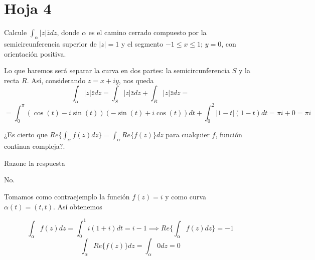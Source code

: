 \newpage
\section{Hoja 4}

\begin{problem}[1]
Calcule $\int_α |z|\bar{z}dz$, donde $α$ es el camino cerrado compuesto por la semicircunferencia superior de $|z|=1$ y el segmento $-1\leq x \leq 1$; $y=0$, con orientación positiva.

\solution


Lo que haremos será separar la curva en dos partes: la semicircunferencia $S$ y la recta $R$. Así, considerando $z=x+iy$, nos queda
\[\int_α |z|\bar{z}dz = \int_S |z|\bar{z}dz + \int_R |z|\bar{z}dz = \]
\[= \int_0^π \left(\cos(t)-i\sin(t)\right)\left(-\sin(t)+i\cos(t)\right)dt + \int_0^2 |1-t|(1-t)dt=πi+0= πi\]

\end{problem}

\begin{problem}[2]
¿Es cierto que $Re\{\int_α f(z) dz\} = \int_α Re\{f(z)\}dz$ para cualquier $f$, función continua compleja?.

Razone la respuesta
\solution


No.

Tomamos como contraejemplo la función $f(z)=i$ y como curva $α(t)=(t,t)$. Así obtenemos

\[\int_α f(z)dz = \int_0^1 i(1+i)dt = i-1 \implies Re\{\int_α f(z) dz\}= -1\]
\[\int_α Re\{f(z)\}dz = \int_α 0dz = 0\]

\end{problem}

